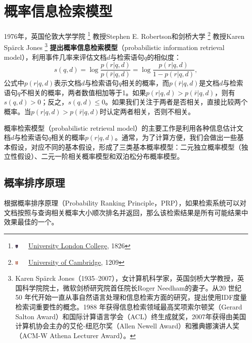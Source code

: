 \chapter{概率信息检索模型}
1976年，英国伦敦大学学院
\footnote{\includegraphics[width=1.5mm]{figures/university/ucl.eps}~~~\href{http://www.ucl.ac.uk/}{University London College}, 1826}
教授Stephen E. Robertson和剑桥大学
\footnote{\includegraphics[width=1.5mm]{figures/university/Cambridge.eps}~~~\href{http://cam.ac.uk/}{University of Cambridge}, 1209}
教授Karen Sp\"{a}rck Jones\cite{robertson1976relevance,robertson2009probabilistic}
\footnote{Karen Sp\"{a}rck Jones（1935--2007），女计算机科学家，英国剑桥大学教授，英国科学院院士，微软剑桥研究院首任院长Roger Needham的妻子。从20 世纪50 年代开始一直从事自然语言处理和信息检索方面的研究，提出使用IDF度量检索词重要性的概念。1988 年获得信息检索领域最高奖项索尔顿奖（Gerard Salton Award）和国际计算语言学会（ACL）终生成就奖，2007年获得由美国计算机协会主办的艾伦-纽厄尔奖（Allen Newell Award）和雅典娜演讲人奖（ACM-W Athena Lecturer Award）。}
\textbf{提出概率信息检索模型}（probabilistic information retrieval model），利用事件几率来评估文档$d$与检索语句$q$的相似度：
\begin{equation}
   s(q,d) = \log \frac{p(r|q,d)}{p(\bar r|q,d)} = \log \frac{p(r|q,d)}{1-p(r|q,d)},
\end{equation}
公式中$p(r|q,d)$表示文档$d$与检索语句$q$相关的概率，而$p(\bar{r}|q,d)$是文档$d$与检索语句$q$不相关的概率，两者数值相加等于1。如果$p(r|q,d) > p(\bar{r}|q,d)$，则有$s(q,d)>0$；反之，$s(q,d)\le 0$。如果我们关注于两者是否相关，直接比较两个概率。当$p(r|q,d) > p(\bar{r}|q,d)$时认定两者相关，否则不相关。

概率检索模型（probabilistic retrieval model）的主要工作是利用各种信息估计文档$d$与检索语句$q$相关的概率$p(r|q,d)$。通常，为了计算方便，我们会做出一些基本假设，对应不同的基本假设，形成了三类基本概率模型：二元独立概率模型（独立性假设）、二元一阶相关概率模型和双泊松分布概率模型。

\section{概率排序原理}
根据概率排序原理（Probability Ranking Principle，PRP），如果检索系统可以对文档按照与查询相关概率大小顺次排名并返回，那么该检索结果是所有可能结果中效果最佳的一个。

